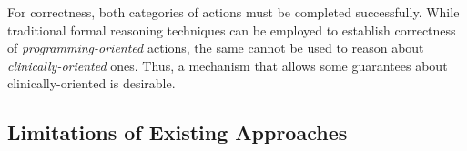 For correctness, both categories of actions must be completed
successfully. While traditional formal reasoning techniques can be employed
to establish correctness of \emph{programming-oriented} actions, the same
cannot be used to reason about \emph{clinically-oriented} ones.
Thus, a mechanism that allows some guarantees about clinically-oriented is
desirable.


\subsection{Limitations of Existing Approaches}

